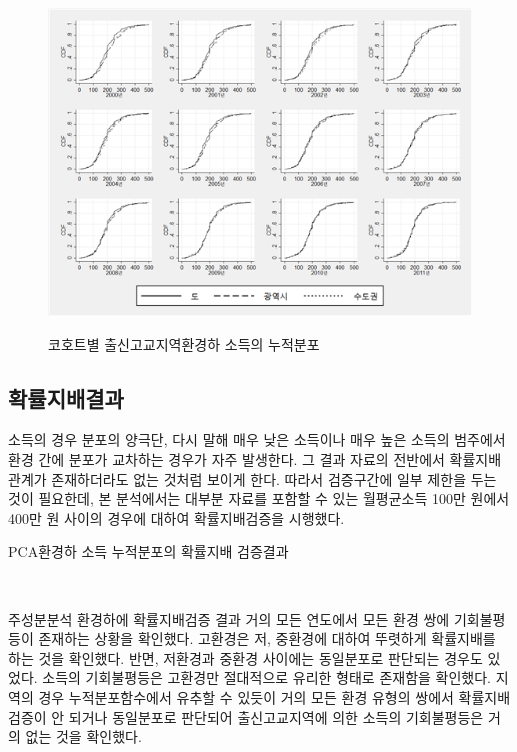 \begin{figure}
    \centering
    \caption{코호트별 출신고교지역환경하 소득의 누적분포}
    \includegraphics[width=\textwidth]{figure/gomse_cdf_byrgn.png}
    \label{fig:gomse_cdf_byrgn}
\end{figure}

\subsection{확률지배결과}
소득의 경우 분포의 양극단, 다시 말해 매우 낮은 소득이나 매우 높은 소득의 범주에서 환경 간에 분포가 교차하는 경우가 자주 발생한다.
그 결과 자료의 전반에서 확률지배관계가 존재하더라도 없는 것처럼 보이게 한다.
따라서 검증구간에 일부 제한을 두는 것이 필요한데, 본 분석에서는 대부분 자료를 포함할 수 있는 월평균소득 100만 원에서 400만 원 사이의 경우에 대하여 확률지배검증을 시행했다.

\begin{table}[htbp]
    \centering
    \caption{PCA환경하 소득 누적분포의 확률지배 검증결과}
    
    \\
    \label{tab:gomse_dom_bypca}
\end{table}

주성분분석 환경하에 확률지배검증 결과 거의 모든 연도에서 모든 환경 쌍에 기회불평등이 존재하는 상황을 확인했다.
고환경은 저, 중환경에 대하여 뚜렷하게 확률지배를 하는 것을 확인했다.
반면, 저환경과 중환경 사이에는 동일분포로 판단되는 경우도 있었다.
소득의 기회불평등은 고환경만 절대적으로 유리한 형태로 존재함을 확인했다.
지역의 경우 누적분포함수에서 유추할 수 있듯이 거의 모든 환경 유형의 쌍에서 확률지배검증이 안 되거나 동일분포로 판단되어 출신고교지역에 의한 소득의 기회불평등은 거의 없는 것을 확인했다.

